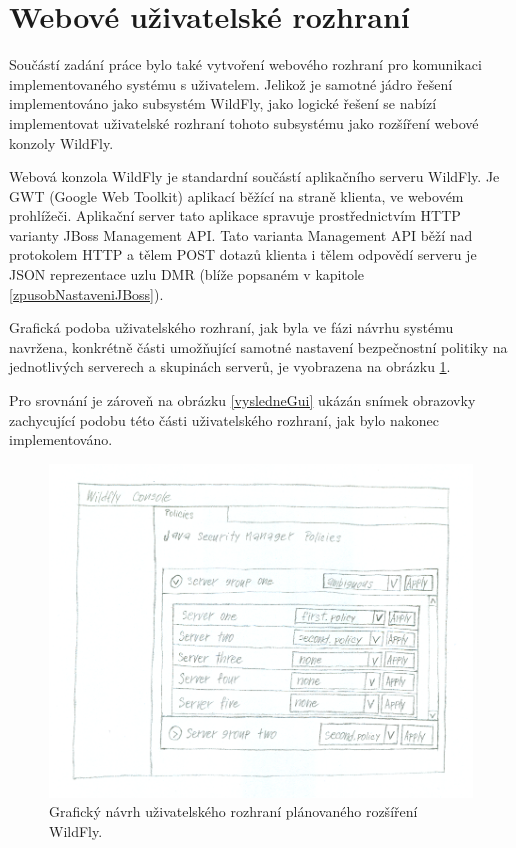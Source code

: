 \section{Webové uživatelské rozhraní} \label{navrhGUI}

Součástí zadání práce bylo také vytvoření webového rozhraní pro komunikaci implementovaného systému s uživatelem.
Jelikož je samotné jádro řešení implementováno jako subsystém WildFly, jako logické řešení se nabízí implementovat uživatelské rozhraní tohoto subsystému jako rozšíření webové konzoly WildFly.

Webová konzola WildFly je standardní součástí aplikačního serveru WildFly. Je GWT (Google Web Toolkit) aplikací běžící na straně klienta, ve webovém prohlížeči.
Aplikační server tato aplikace spravuje prostřednictvím HTTP varianty JBoss Management API.
Tato varianta Management API běží nad protokolem HTTP a tělem POST dotazů klienta i tělem odpovědí serveru je JSON reprezentace uzlu DMR (blíže popsaném v kapitole \ref{zpusobNastaveniJBoss}).
\cite{WildFlyManagementAPIreference}

Grafická podoba uživatelského rozhraní, jak byla ve fázi návrhu systému navržena, konkrétně části umožňující samotné nastavení bezpečnostní politiky na jednotlivých serverech a skupinách serverů, je vyobrazena na obrázku \ref{navrhGui}.

Pro srovnání je zároveň na obrázku \ref{vysledneGui} ukázán snímek obrazovky zachycující podobu této části uživatelského rozhraní, jak bylo nakonec implementováno.

\begin{figure}[ht]
  \centering
  \includegraphics[width=14cm]{fig/mockup}
  \caption{Grafický návrh uživatelského rozhraní plánovaného rozšíření WildFly.}
  \label{navrhGui}
\end{figure}

